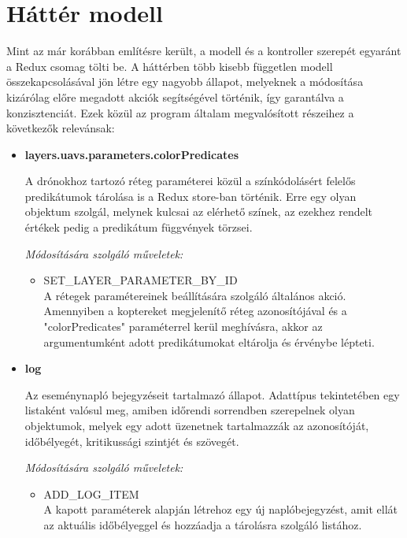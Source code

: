 \section{Háttér modell}

Mint az már korábban említésre került, a modell és a kontroller szerepét
egyaránt a Redux csomag tölti be. A háttérben több kisebb független modell
összekapcsolásával jön létre egy nagyobb állapot, melyeknek a módosítása
kizárólag előre megadott akciók segítségével történik, így garantálva a
konzisztenciát. Ezek közül az program általam megvalósított részeihez a
következők relevánsak:

\begin{itemize}

  \item \textbf{layers.uavs.parameters.colorPredicates}

    A drónokhoz tartozó réteg paraméterei közül a színkódolásért felelős
    predikátumok tárolása is a Redux store-ban történik. Erre egy olyan objektum
    szolgál, melynek kulcsai az elérhető színek, az ezekhez rendelt értékek
    pedig a predikátum függvények törzsei.

    \textit{Módosítására szolgáló műveletek:}

    \begin{itemize}
      \item SET\_LAYER\_PARAMETER\_BY\_ID \\
        A rétegek paramétereinek beállítására szolgáló általános akció.
        Amennyiben a koptereket megjelenítő réteg azonosítójával és a
        "colorPredicates" paraméterrel kerül meghívásra, akkor az argumentumként
        adott predikátumokat eltárolja és érvénybe lépteti.
    \end{itemize}

  \item \textbf{log}

    Az eseménynapló bejegyzéseit tartalmazó állapot. Adattípus tekintetében egy
    listaként valósul meg, amiben időrendi sorrendben szerepelnek olyan
    objektumok, melyek egy adott üzenetnek tartalmazzák az azonosítóját,
    időbélyegét, kritikussági szintjét és szövegét.

    \textit{Módosítására szolgáló műveletek:}

    \begin{itemize}
      \item ADD\_LOG\_ITEM \\
        A kapott paraméterek alapján létrehoz egy új naplóbejegyzést, amit ellát
        az aktuális időbélyeggel és hozzáadja a tárolásra szolgáló listához.


\end{itemize}
\end{itemize}
